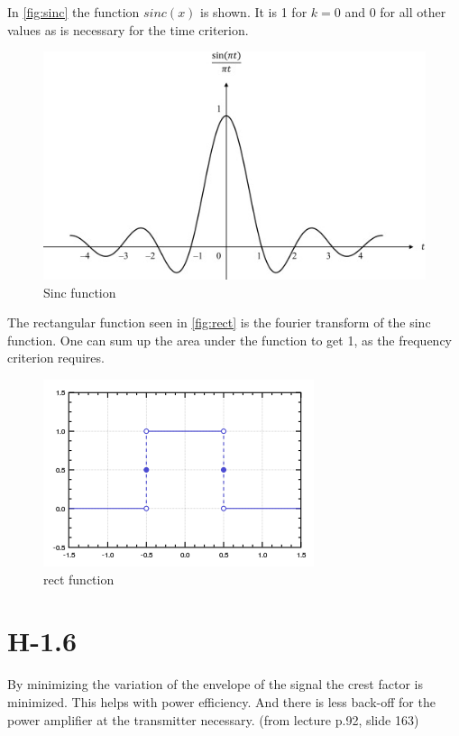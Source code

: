 \documentclass{article}
\begin{document}
In \autoref{fig:sinc} the function $sinc(x)$ is shown.
It is 1 for $k = 0$ and 0 for all other values as is necessary for the time criterion.

\begin{figure}[h]
\centering
\includegraphics[width=\textwidth]{sinc.jpg}
\caption{Sinc function}
\label{fig:sinc}
\end{figure}

The rectangular function seen in \autoref{fig:rect} is the fourier transform of the sinc function.
One can sum up the area under the function to get 1, as the frequency criterion requires.

\begin{figure}[h]
\centering
\includegraphics[width=\textwidth]{rect.svg.png}
\caption{rect function}
\label{fig:rect}
\end{figure}

\section{H-1.6}
By minimizing the variation of the envelope of the signal the crest factor is minimized.
This helps with power efficiency.
And there is less back-off for the power amplifier at the transmitter necessary. (from lecture p.92, slide 163)
\end{document}
